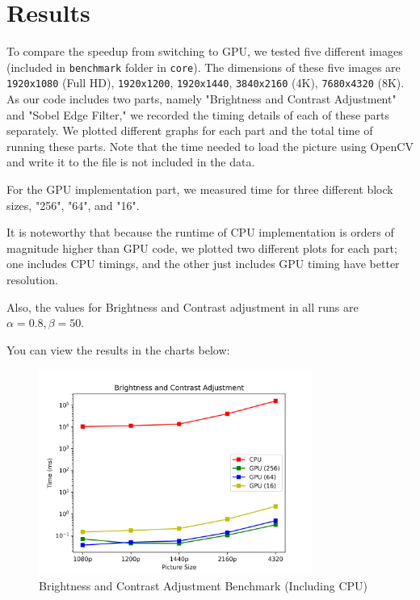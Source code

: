 \documentclass[12pt]{article}
\begin{document}
\newpage 
\section{Results}

To compare the speedup from switching to GPU, we tested five different images (included in \Verb+benchmark+ folder in \Verb+core+). The dimensions of these five images are \Verb+1920x1080+ (Full HD), \Verb+1920x1200+, \Verb+1920x1440+, \Verb+3840x2160+ (4K), \Verb+7680x4320+ (8K). As our code includes two parts, namely "Brightness and Contrast Adjustment" and "Sobel Edge Filter," we recorded the timing details of each of these parts separately. We plotted different graphs for each part and the total time of running these parts. Note that the time needed to load the picture using OpenCV and write it to the file is not included in the data.

For the GPU implementation part, we measured time for three different block sizes, "256", "64", and "16".

It is noteworthy that because the runtime of CPU implementation is orders of magnitude higher than GPU code, we plotted two different plots for each part; one includes CPU timings, and the other just includes GPU timing have better resolution.

Also, the values for Brightness and Contrast adjustment in all runs are $\alpha = 0.8, \beta=50$.

You can view the results in the charts below:

\begin{figure}[H]
	\centering
	\includegraphics[width=0.8\textwidth]{./images/BCA.png}	
	\cprotect\caption{Brightness and Contrast Adjustment Benchmark (Including CPU)}
	\label{fig:1}
\end{figure}
\end{document}
